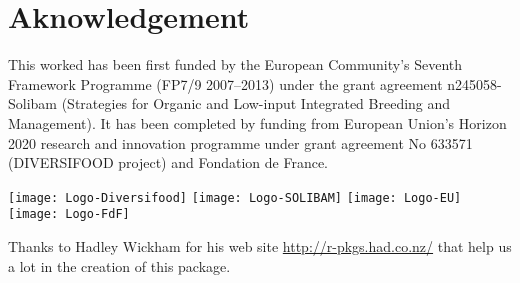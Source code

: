 
\section*{Aknowledgement} 
This worked has been first funded by the European Community’s Seventh Framework Programme (FP7/9 2007–2013) under the grant agreement n245058-Solibam (Strategies for Organic and Low-input Integrated Breeding and Management).
It has been completed by funding from European Union’s Horizon 2020 research and innovation programme under grant agreement No 633571 (DIVERSIFOOD project) and Fondation de France.


\begin{center}
\texttt{[image: Logo-Diversifood]} \hspace{.5cm}
\texttt{[image: Logo-SOLIBAM]} \hspace{.5cm}
\texttt{[image: Logo-EU]} \hspace{.5cm}
\texttt{[image: Logo-FdF]}
\end{center}

Thanks to Hadley Wickham for his web site \url{http://r-pkgs.had.co.nz/} that help us a lot in the creation of this package.


